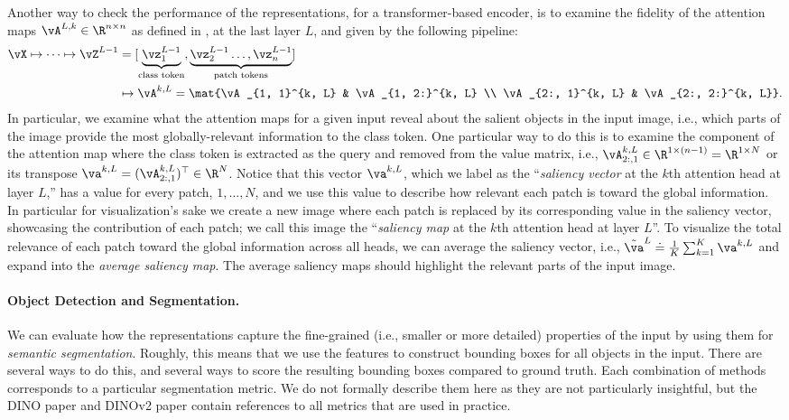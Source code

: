 \documentclass[../../book-main.tex]{subfiles}
\begin{document}
Another way to check the performance of the representations, for a
transformer-based encoder, is to examine the fidelity of the
attention maps \(\vA^{L, k} \in \R^{n \times n}\) as defined in
, at the last layer \(L\), and given by the
following pipeline:
\begin{align}
\vX \mapsto \cdots \mapsto \vZ^{L - 1} &= [\underbrace{\vz_{1}^{L -
    1}}_{\text{class token}}, \underbrace{\vz_{2}^{L - 1} \dots,
\vz_{n}^{L - 1}}_{\text{patch tokens}}] \nonumber \\
&\mapsto \vA^{k, L} =
\mat{\vA_{1, 1}^{k, L} & \vA_{1, 2:}^{k, L} \\ \vA_{2:, 1}^{k, L} &
\vA_{2:, 2:}^{k, L}} .
\end{align}
In particular, we examine what the attention maps for a given input
reveal about the salient objects in the input image, i.e., which
parts of the image provide the most globally-relevant information to
the class token.
One particular way to do this is to examine the
component of the attention map where the class token is extracted as
the query and removed from the value matrix, i.e., \(\vA_{2:, 1}^{k,
L} \in \R^{1 \times (n - 1)} = \R^{1 \times N}\) or its transpose
\(\va^{k, L} = (\vA_{2:, 1}^{k, L})^{\top} \in \R^{N}\).
Notice that
this vector \(\va^{k, L}\), which we label as the ``\textit{saliency
vector} at the \(k\)th attention head at layer \(L\),'' has a value
for every patch, \(1, \dots, N\), and we use this value to describe
how relevant each patch is toward the global information.
In
particular for visualization's sake we create a new image where each
patch is replaced by its corresponding value in the saliency vector,
showcasing the contribution of each patch;
we call this image the
``\textit{saliency map} at the \(k\)th attention head at layer
\(L\)''.
To visualize the total relevance of each patch toward the
global information across all heads, we can average the saliency
vector, i.e., \(\tilde{\va}^{L} \doteq \frac{1}{K}\sum_{k =
1}^{K}\va^{k, L}\) and expand into the \textit{average saliency map}.
The average saliency maps should highlight the relevant parts of the
input image.

\paragraph{Object Detection and Segmentation.}

We can evaluate how the representations capture the fine-grained
(i.e., smaller or more detailed) properties of the input by using
them for \textit{semantic segmentation}.
Roughly, this means that we
use the features to construct bounding boxes for all objects in the
input.
There are several ways to do this, and several ways to score
the resulting bounding boxes compared to ground truth.
Each
combination of methods corresponds to a particular segmentation
metric. We do not formally describe them here as they are not
particularly insightful, but the DINO paper \citep{caron2021emerging}
and DINOv2 paper \citep{oquab2023dinov2} contain references to all
metrics that are used in practice.
\end{document}
